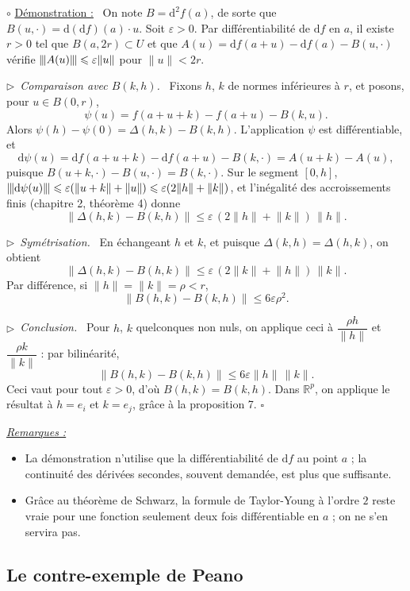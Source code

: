 \documentclass[a4paper,twoside]{report}
\newenvironment{demo}%
 {\par\needspace{4\baselineskip}\vspace{1mm}\noindent$\circ$ \underline{Démonstration :}~\setlength{\parskip}{3pt plus 1pt}}%
 {\hfill$\square$\par\vspace{2mm}}
\newcommand{\etape}[1]{\par\smallskip\noindent$\triangleright$~\textit{#1}~}
\newenvironment{remarques}%
 {\par\needspace{6\baselineskip}\vspace{1mm}\begin{list}{}{\leftmargin=1cm \rightmargin=0.5cm}\item[]%
  \textit{\underline{Remarques :}}%
  \begin{itemize}[label=$\bullet$,leftmargin=0.45cm,topsep=3pt,itemsep=4pt]}%
 {\end{itemize}\end{list}\vspace{1mm}}
\newcommand{\R}{\mathbb{R}}
\newcommand{\dd}{\mathrm{d}}                      %
\newcommand{\norme}[1]{\lVert #1 \rVert}         %
\newcommand{\nop}[1]{|\mkern-1.5mu|\mkern-1.5mu|#1|\mkern-1.5mu|\mkern-1.5mu|}   %
\newcommand{\Bo}{B}                               %
\begin{document}
\begin{demo}
On note $B = \dd^{2} f(a)$, de sorte que $B(u, \cdot) = \dd(\dd f)(a)\cdot u$. Soit $\varepsilon > 0$. Par différentiabilité de $\dd f$ en $a$, il existe $r > 0$ tel que $\Bo(a, 2r) \subset U$ et que $A(u) = \dd f(a + u) - \dd f(a) - B(u, \cdot)$ vérifie $\nop{A(u)} \leqslant \varepsilon\norme{u}$ pour $\norme{u} < 2r$.

\etape{Comparaison avec $B(k, h)$.} Fixons $h$, $k$ de normes inférieures à $r$, et posons, pour $u \in \Bo(0, r)$,
\[ \psi(u) = f(a + u + k) - f(a + u) - B(k, u). \]
Alors $\psi(h) - \psi(0) = \Delta(h, k) - B(k, h)$. L'application $\psi$ est différentiable, et
\[ \dd\psi(u) = \dd f(a + u + k) - \dd f(a + u) - B(k, \cdot) = A(u + k) - A(u), \]
puisque $B(u + k, \cdot) - B(u, \cdot) = B(k, \cdot)$. Sur le segment $[0, h]$, $\nop{\dd\psi(u)} \leqslant \varepsilon(\norme{u + k} + \norme{u}) \leqslant \varepsilon(2\norme{h} + \norme{k})$, et l'inégalité des accroissements finis (chapitre 2, théorème 4) donne
\[ \norme{\Delta(h, k) - B(k, h)} \leqslant \varepsilon\,(2\norme{h} + \norme{k})\,\norme{h}. \]

\etape{Symétrisation.} En échangeant $h$ et $k$, et puisque $\Delta(k, h) = \Delta(h, k)$, on obtient
\[ \norme{\Delta(h, k) - B(h, k)} \leqslant \varepsilon\,(2\norme{k} + \norme{h})\,\norme{k}. \]
Par différence, si $\norme{h} = \norme{k} = \rho < r$,
\[ \norme{B(h, k) - B(k, h)} \leqslant 6\varepsilon\rho^{2}. \]

\etape{Conclusion.} Pour $h$, $k$ quelconques non nuls, on applique ceci à $\dfrac{\rho h}{\norme{h}}$ et $\dfrac{\rho k}{\norme{k}}$ : par bilinéarité,
\[ \norme{B(h, k) - B(k, h)} \leqslant 6\varepsilon\norme{h}\,\norme{k}. \]
Ceci vaut pour tout $\varepsilon > 0$, d'où $B(h, k) = B(k, h)$. Dans $\R^{p}$, on applique le résultat à $h = e_{i}$ et $k = e_{j}$, grâce à la proposition 7.
\end{demo}

\begin{remarques}
  \item La démonstration n'utilise que la différentiabilité de $\dd f$ au point $a$ ; la continuité des dérivées secondes, souvent demandée, est plus que suffisante.
  \item Grâce au théorème de Schwarz, la formule de Taylor-Young à l'ordre $2$ reste vraie pour une fonction seulement deux fois différentiable en $a$ ; on ne s'en servira pas.
\end{remarques}

\subsection{Le contre-exemple de Peano}
\end{document}

